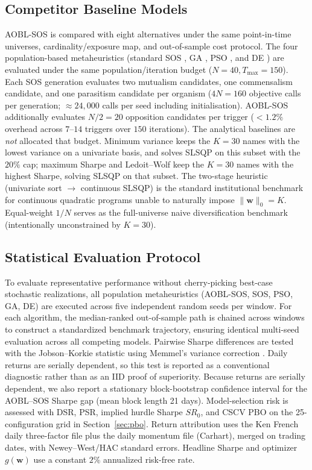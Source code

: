 \documentclass[11pt,a4paper]{article}
\begin{document}
\subsection{Competitor Baseline Models}
\label{sec:competitors}
AOBL-SOS is compared with eight alternatives under the same point-in-time universes, cardinality/exposure map, and out-of-sample cost protocol. The four population-based metaheuristics (standard SOS \cite{cheng2014}, GA \cite{holland1992}, PSO \cite{kennedy1995}, and DE \cite{storn1997}) are evaluated under the same population/iteration budget ($N=40, T_{\max}=150$). Each SOS generation evaluates two mutualism candidates, one commensalism candidate, and one parasitism candidate per organism ($4N=160$ objective calls per generation; $\approx 24{,}000$ calls per seed including initialisation). AOBL-SOS additionally evaluates $N/2=20$ opposition candidates per trigger ($<1.2\%$ overhead across $7$--$14$ triggers over $150$ iterations). The analytical baselines are \emph{not} allocated that budget. Minimum variance keeps the $K=30$ names with the lowest variance on a univariate basis, and solves SLSQP on this subset with the $20\%$ cap; maximum Sharpe \cite{markowitz1952} and Ledoit--Wolf \cite{ledoit2004} keep the $K=30$ names with the highest Sharpe, solving SLSQP on that subset. The two-stage heuristic (univariate sort $\to$ continuous SLSQP) is the standard institutional benchmark for continuous quadratic programs unable to naturally impose $\|\mathbf{w}\|_0=K$. Equal-weight $1/N$ \cite{demiguel2009} serves as the full-universe naive diversification benchmark (intentionally unconstrained by $K=30$).

\subsection{Statistical Evaluation Protocol}
\label{sec:stat_eval}
To evaluate representative performance without cherry-picking best-case stochastic realizations, all population metaheuristics (AOBL-SOS, SOS, PSO, GA, DE) are executed across five independent random seeds per window. For each algorithm, the median-ranked out-of-sample path is chained across windows to construct a standardized benchmark trajectory, ensuring identical multi-seed evaluation across all competing models. Pairwise Sharpe differences are tested with the Jobson--Korkie statistic using Memmel's variance correction \cite{jobson1981, memmel2003}. Daily returns are serially dependent, so this test is reported as a conventional diagnostic rather than as an IID proof of superiority. Because returns are serially dependent, we also report a stationary block-bootstrap confidence interval for the AOBL--SOS Sharpe gap (mean block length 21 days). Model-selection risk is assessed with DSR, PSR, implied hurdle Sharpe $SR_0$, and CSCV PBO on the 25-configuration grid in Section~\ref{sec:pbo}. Return attribution uses the Ken French daily three-factor file plus the daily momentum file (Carhart), merged on trading dates, with Newey--West/HAC standard errors. Headline Sharpe and optimizer $g(\mathbf{w})$ use a constant $2\%$ annualized risk-free rate.
\end{document}
